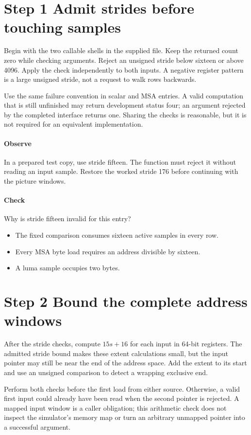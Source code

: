 \section{Step 1 Admit strides before touching samples}\label{h263-sad-s01}
Begin with the two callable shells in the supplied file. Keep the returned count
zero while checking arguments. Reject an unsigned stride below sixteen or above
4096. Apply the check independently to both inputs. A negative register pattern
is a large unsigned stride, not a request to walk rows backwards.

Use the same failure convention in scalar and MSA entries. A valid computation
that is still unfinished may return development status four; an argument rejected
by the completed interface returns one. Sharing the checks is reasonable, but it
is not required for an equivalent implementation.

\paragraph{Observe} In a prepared test copy, use stride fifteen. The function
must reject it without reading an input sample. Restore the worked stride 176
before continuing with the picture windows.
\paragraph{Check} Why is stride fifteen invalid for this entry?
\begin{itemize}
  \item[A.] The fixed comparison consumes sixteen active samples in every row.
  \item[B.] Every MSA byte load requires an address divisible by sixteen.
  \item[C.] A luma sample occupies two bytes.
\end{itemize}

\section{Step 2 Bound the complete address windows}\label{h263-sad-s02}
After the stride checks, compute $15s+16$ for each input in 64-bit registers.
The admitted stride bound makes these extent calculations small, but the input
pointer may still be near the end of the address space. Add the extent to its
start and use an unsigned comparison to detect a wrapping exclusive end.

Perform both checks before the first load from either source. Otherwise, a valid
first input could already have been read when the second pointer is rejected.
A mapped input window is a caller obligation; this arithmetic check does not
inspect the simulator's memory map or turn an arbitrary unmapped pointer into a
successful argument.

